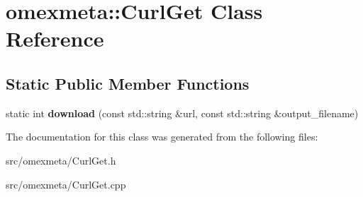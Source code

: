 \hypertarget{classomexmeta_1_1CurlGet}{}\section{omexmeta\+:\+:Curl\+Get Class Reference}
\label{classomexmeta_1_1CurlGet}
\subsection*{Static Public Member Functions}
\begin{DoxyCompactItemize}
\item 
\mbox{\label{classomexmeta_1_1CurlGet_a52eaa2b1179cf49ec298022011b2477c}} 
static int {\bfseries download} (const std\+::string \&url, const std\+::string \&output\+\_\+filename)
\end{DoxyCompactItemize}


The documentation for this class was generated from the following files\+:\begin{DoxyCompactItemize}
\item 
src/omexmeta/Curl\+Get.\+h\item 
src/omexmeta/Curl\+Get.\+cpp\end{DoxyCompactItemize}
